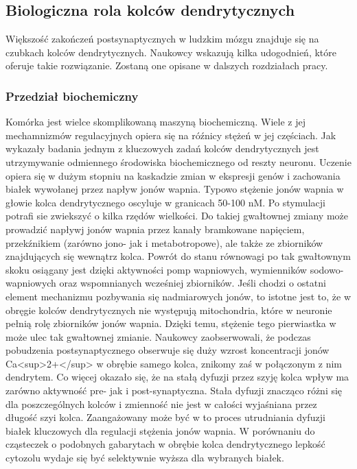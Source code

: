 \documentclass{article}
\begin{document}
\subsection{Biologiczna rola kolców dendrytycznych}
Większość zakończeń postsynaptycznych %
w ludzkim mózgu znajduje się na czubkach kolców dendrytycznych.
Naukowcy wskazują kilka udogodnień, które oferuje takie rozwiązanie.
Zostaną one opisane w dalszych rozdziałach pracy.
\subsubsection{Przedział biochemiczny}
Komórka jest wielce skomplikowaną maszyną biochemiczną. 
Wiele z jej mechamnizmów regulacyjnych opiera się na róźnicy stężeń w jej częściach. 
Jak wykazały badania %
jednym z kluczowych zadań kolców dendrytycznych jest utrzymywanie odmiennego środowiska biochemicznego od reszty neuronu.
Uczenie opiera się w dużym stopniu na kaskadzie zmian w ekspresji genów i zachowania białek wywołanej przez napływ jonów wapnia.
Typowo stężenie jonów wapnia w głowie kolca dendrytycznego oscyluje w granicach 50-100	 nM.
Po stymulacji potrafi sie zwiekszyć o kilka rzędów wielkości.
Do takiej gwałtownej zmiany może prowadzić napływj jonów wapnia przez kanały bramkowane napięciem, przekźnikiem (zarówno jono- jak i metabotropowe), ale także ze zbiorników znajdujących się wewnątrz kolca.
Powrót do stanu równowagi po tak gwałtownym skoku osiągany jest dzięki aktywności pomp wapniowych, wymienników sodowo-wapniowych oraz wspomnianych wcześniej zbiorników.
Jeśli chodzi o ostatni element mechanizmu pozbywania się nadmiarowych jonów, to istotne jest to, że w obręgie kolców dendrytycznych nie występują mitochondria, które w neuronie pełnią rolę zbiorników jonów wapnia. 
Dzięki temu, stężenie tego pierwiastka w może ulec tak gwałtownej zmianie\citep{Sala2014}.
Naukowcy zaobserwowali, że podczas pobudzenia postsynaptycznego obserwuje się duży wzrost koncentracji jonów Ca<sup>{2+}</sup> w obrębie samego kolca, znikomy zaś w połączonym z nim dendrytem.
Co więcej okazało się, że na stałą dyfuzji przez szyję kolca wpływ ma zarówno aktywność pre- jak i post-synaptyczna.
Stała dyfuzji znacząco różni się dla poszczególnych kolców i zmienność nie jest w całości wyjaśniana przez długość szyi kolca.
Zaangażowany może być w to proces utrudniania dyfuzji białek kluczowych dla regulacji stężenia jonów wapnia\citep{Costa2007}.
W porównaniu do cząsteczek o podobnych gabarytach w obrębie kolca dendrytycznego lepkość cytozolu wydaje się być selektywnie wyższa dla wybranych białek.
\end{document}
